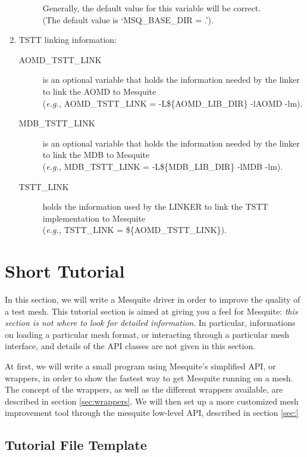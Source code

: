 \documentclass[letter]{report}
\begin{document}
\begin{enumerate}
\begin{description}
	Generally, the default value for this variable will be correct.\\
	(The default value is `MSQ\_BASE\_DIR = .').
  \end{description}
\item TSTT linking information:
\begin{description}
  \item[AOMD\_TSTT\_LINK] is an optional variable that holds the
	information needed by the linker to link the AOMD to Mesquite\\
	({\it e.g.,} AOMD\_TSTT\_LINK = -L\$\{AOMD\_LIB\_DIR\} -lAOMD -lm).
  \item[MDB\_TSTT\_LINK] is an optional variable that holds the
	information needed by the linker to link the MDB to Mesquite\\
	({\it e.g.,} MDB\_TSTT\_LINK = -L\$\{MDB\_LIB\_DIR\} -lMDB -lm).
  \item[TSTT\_LINK] holds the information used by the LINKER to link
	the TSTT implementation to Mesquite \\
	({\it e.g.,} TSTT\_LINK = \$\{AOMD\_TSTT\_LINK\}).
\end{description}
\end{enumerate}

\section{Short Tutorial}

In this section, we will write a Mesquite driver in order to improve the quality of a test
mesh. This tutorial section is aimed at giving you a feel for Mesquite: \emph{this section is not where to look
for detailed information}. In particular, informations on loading a particular mesh format, or
interacting through a particular mesh interface, and details of the API classes
are not given in this section.

At first, we will write a small program using Mesquite's simplified API, or wrappers, in order to show the
fastest way to get Mesquite running on a mesh. The concept of the wrappers, as well as the different
wrappers available, are described in section \ref{sec:wrappers}. We will then set up a more customized mesh
improvement tool through the mesquite low-level API, described in section \ref{sec:}

\subsection{Tutorial File Template}
\label{sec:tutfile}
\end{document}
